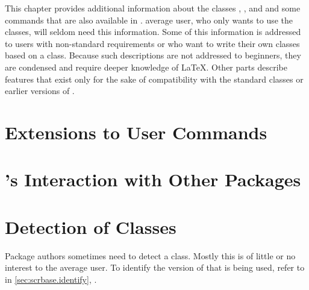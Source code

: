 \BeginIndexGroup%
%
%
%
%
This chapter provides additional information about the \KOMAScript{} classes
, , and  and some commands that
are also available in .  average user, who only wants to
use the classes, will seldom need this information. Some of this information
is addressed to users with non-standard requirements or who want to write
their own classes based on a \KOMAScript{} class. Because such descriptions
are not addressed to beginners, they are condensed and require deeper
knowledge of \LaTeX. Other parts describe features that exist only for the
sake of compatibility with the standard classes or earlier versions of
\KOMAScript{}.


\section{Extensions to User Commands}



\section{\KOMAScript's Interaction with Other Packages}



\section{Detection of \KOMAScript{} Classes}

Package authors sometimes need to detect a \KOMAScript{} class. Mostly this is
of little or no interest to the average user. To identify the version of
\KOMAScript{} that is being used, refer to
 in \autoref{sec:scrbase.identify},
.

